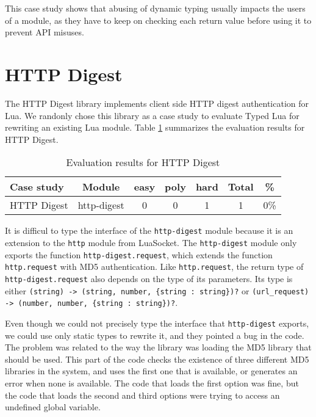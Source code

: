 This case study shows that abusing of dynamic typing usually impacts
the users of a module, as they have to keep on checking each return
value before using it to prevent API misuses.

\section{HTTP Digest}

The HTTP Digest library \citep{luahttpdigest} implements client side
HTTP digest authentication for Lua.
We randonly chose this library as a case study to evaluate Typed Lua
for rewriting an existing Lua module.
Table \ref{tab:evalhttpdigest} summarizes the evaluation results for HTTP Digest.

\begin{table}[!ht]
\begin{center}
\begin{tabular}{|l|c|c|c|c|c|c|}
\hline
\textbf{Case study} & \textbf{Module} & \textbf{easy} & \textbf{poly} & \textbf{hard} & \textbf{Total} & \textbf{\%} \\
\hline
\multirow{1}{*}{HTTP Digest}
& http-digest & 0 & 0 & 1 & 1 & 0\% \\
\hline
\end{tabular}
\end{center}
\caption{Evaluation results for HTTP Digest}
\label{tab:evalhttpdigest}
\end{table}

It is difficul to type the interface of the \texttt{http-digest} module
because it is an extension to the \texttt{http} module from LuaSocket.
The \texttt{http-digest} module only exports the function
\texttt{http-digest.request}, which extends the function
\texttt{http.request} with MD5 authentication.
Like \texttt{http.request}, the return type of \texttt{http-digest.request}
also depends on the type of its parameters.
Its type is either
\texttt{(string) -> (string, number, \{string : string\})?} or
\texttt{(url\string_request) -> (number, number, \{string : string\})?}.

Even though we could not precisely type the interface that \texttt{http-digest}
exports, we could use only static types to rewrite it, and they pointed a bug
in the code.
The problem was related to the way the library was loading the MD5 library
that should be used. 
This part of the code checks the existence of three different MD5 libraries
in the system, and uses the first one that is available, or generates an
error when none is available.
The code that loads the first option was fine, but the code that loads the
second and third options were trying to access an undefined global variable.

